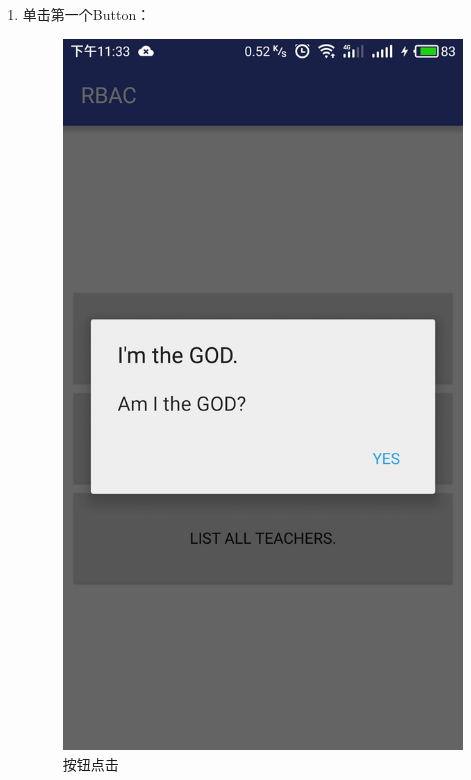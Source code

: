 \begin{itemize}
\begin{enumerate}
\begin{itemize}
\begin{enumerate}
				\item 单击第一个Button：
				\begin{figure}[H]
					\centering
					\includegraphics[height=0.39\textheight]{snapshot/15}
					\caption{按钮点击}
					\label{fig:15}
				\end{figure}
			

\end{enumerate}
\end{itemize}
\end{enumerate}
\end{itemize}
